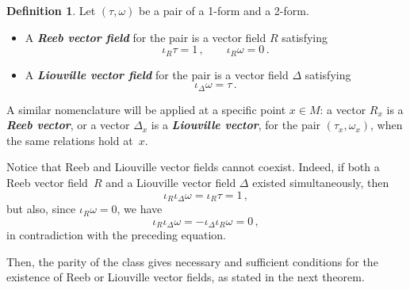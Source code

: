 \documentclass[11pt,twoside]{article}
\theoremstyle{plain}
\theoremstyle{definition}
\newtheorem{definition}[theorem]{Definition}
\newcommand*{\inn}[1]{\iota_{#1}}
\newcommand\dfn[1]{{\textbf{\emph{#1}}}}
\begin{document}
\begin{definition}
Let $(\tau,\omega)$ be a pair of a 1-form and a 2-form.
\begin{itemize}
\item A \dfn{Reeb vector field} for the pair 
is a vector field $R$ satisfying
\begin{equation}
\label{reeb_definition}
\inn{R}\tau= 1\,, \qquad \inn{R}\omega=0\,. 
\end{equation}

\item A \dfn{Liouville vector field} for the pair 
is a vector field $\Delta$ satisfying
\begin{equation}
\label{Liouville_vf}
\inn{\Delta}\omega = \tau \,.
\end{equation}
\end{itemize}

A similar nomenclature will be applied at a specific point $x \in M$:
a vector $R_x$ is a \dfn{Reeb vector}, 
or a vector $\Delta_x$ is a \dfn{Liouville vector},
for the pair $(\tau_x,\omega_x)$,
when the same relations hold at~$x$.
\end{definition}

Notice that Reeb and Liouville vector fields cannot coexist.
Indeed, if both a
Reeb vector field~$R$ and a Liouville vector field $\Delta$ existed simultaneously, then
$$
\inn{R} \inn{\Delta} \omega
  = \inn{R} \tau
  = 1\,,
$$
but also, since $\inn{R} \omega = 0$, we have
$$
\inn{R} \inn{\Delta} \omega
  = - \inn{\Delta} \inn{R} \omega
  = 0\,,
$$
in contradiction with the preceding equation.

Then, the parity of the class gives 
necessary and sufficient conditions
for the existence of Reeb or Liouville vector fields, as stated in the next theorem.
\end{document}
